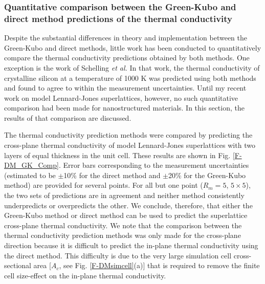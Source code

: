 \documentclass[letterpaper,12pt]{article}
\begin{document}

\subsubsection*{\label{S-MD-prediction}Quantitative comparison between the Green-Kubo and direct method predictions of the thermal conductivity}


Despite the substantial differences in theory and implementation
between the Green-Kubo and direct methods, little work has been
conducted to quantitatively compare the thermal conductivity
predictions obtained by both methods. One exception is the work of
Schelling \textit{et al.} \cite{schelling2002} In that work, the
thermal conductivity of crystalline silicon at a temperature of 1000
K was predicted using both methods and found to agree to within the
measurement uncertainties. Until my recent work on model
Lennard-Jones superlattices,\cite{landry2008a} however, no such
quantitative comparison had been made for nanostructured materials.
In this section, the results of that comparison are discussed.

The thermal conductivity prediction methods were compared by
predicting the cross-plane thermal conductivity of model
Lennard-Jones superlattices with two layers of equal thickness in
the unit cell. These results are shown in Fig$.$ \ref{F-DM_GK_Comp}.
Error bars corresponding to the measurement uncertainties (estimated
to be $\pm$10\% for the direct method and $\pm$20\% for the
Green-Kubo method) are provided for several points. For all but one
point ($R_m = 5$, $5\times5$), the two sets of predictions are in
agreement and neither method consistently underpredicts or
overpredicts the other. We conclude, therefore, that either the
Green-Kubo method or direct method can be used to predict the
superlattice cross-plane thermal conductivity. We note that the
comparison between the thermal conductivity prediction methods was
only made for the cross-plane direction because it is difficult to
predict the in-plane thermal conductivity using the direct method.
This difficulty is due to the very large simulation cell
cross-sectional area [$A_c$, see Fig. \ref{F-DMsimcell}(a)] that is
required to remove the finite cell size-effect on the in-plane
thermal conductivity.
\end{document}
